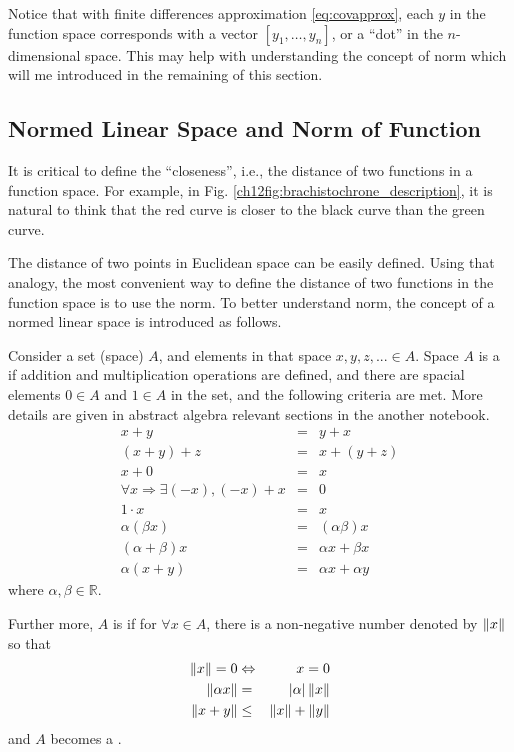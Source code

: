 Notice that with finite differences approximation \eqref{eq:covapprox}, each $y$ in the function space corresponds with a vector $[y_1, \ldots, y_n]$, or a ``dot'' in the $n$-dimensional space. This may help with understanding the concept of norm which will me introduced in the remaining of this section. 

\subsection{Normed Linear Space and Norm of Function}

It is critical to define the ``closeness'', i.e., the distance of two functions in a function space. For example, in Fig. \ref{ch12fig:brachistochrone_description}, it is natural to think that the red curve is closer to the black curve than the green curve. 

The distance of two points in Euclidean space can be easily defined. Using that analogy, the most convenient way to define the distance of two functions in the function space is to use the norm. To better understand norm, the concept of a normed linear space is introduced as follows.

Consider a set (space) $A$, and elements in that space $x, y, z, ... \in A$. Space $A$ is a  if addition and multiplication operations are defined, and there are spacial elements $0\in A$ and $1 \in A$ in the set, and the following criteria are met. More details are given in abstract algebra relevant sections in the another notebook. 
\begin{eqnarray}
	x + y &=& y + x \nonumber \\
	(x + y) + z &=& x + (y + z) \nonumber \\
	x + 0 &=& x \nonumber \\
	\forall x \Rightarrow \exists (-x), (-x) + x &=& 0 \nonumber \\
	1 \cdot x &=& x \nonumber \\
	\alpha(\beta x) &=& (\alpha\beta)x \nonumber \\
	(\alpha + \beta)x &=& \alpha x + \beta x \nonumber \\
	\alpha(x+y) &=& \alpha x + \alpha y \nonumber
\end{eqnarray}
where $\alpha, \beta \in \mathbb{R}$.

Further more, $A$ is  if for $\forall x \in A$, there is a non-negative number denoted by $\left\lVert x\right\rVert$ so that
\begin{eqnarray}
	\left\lVert x\right\rVert = 0 &\Leftrightarrow& x = 0 \nonumber \\
	\left\lVert\alpha x\right\rVert &=& |\alpha| \left\lVert x\right\rVert \nonumber \\
	\left\lVert x + y\right\rVert &\leq& \left\lVert x\right\rVert + \left\lVert y\right\rVert \nonumber
\end{eqnarray}
and $A$ becomes a .

